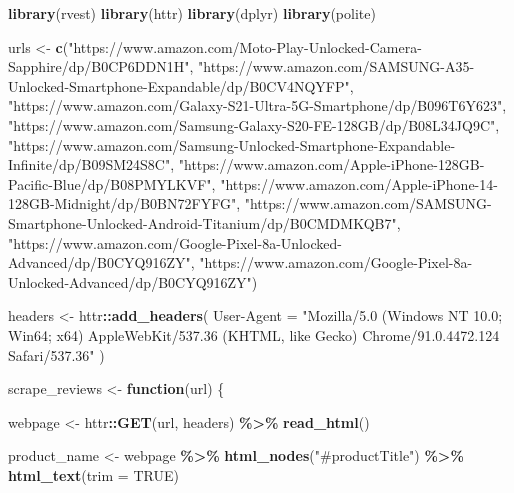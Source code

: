 \documentclass[
  11pt,
]{article}
\newenvironment{Shaded}{\begin{snugshade}}{\end{snugshade}}
\newcommand{\AttributeTok}[1]{\textcolor[rgb]{0.13,0.29,0.53}{#1}}
\newcommand{\ConstantTok}[1]{\textcolor[rgb]{0.56,0.35,0.01}{#1}}
\newcommand{\ControlFlowTok}[1]{\textcolor[rgb]{0.13,0.29,0.53}{\textbf{#1}}}
\newcommand{\FunctionTok}[1]{\textcolor[rgb]{0.13,0.29,0.53}{\textbf{#1}}}
\newcommand{\NormalTok}[1]{#1}
\newcommand{\OtherTok}[1]{\textcolor[rgb]{0.56,0.35,0.01}{#1}}
\newcommand{\SpecialCharTok}[1]{\textcolor[rgb]{0.81,0.36,0.00}{\textbf{#1}}}
\newcommand{\StringTok}[1]{\textcolor[rgb]{0.31,0.60,0.02}{#1}}
\begin{document}
\begin{Shaded}
\begin{Highlighting}[]
\FunctionTok{library}\NormalTok{(rvest)}
\FunctionTok{library}\NormalTok{(httr)}
\FunctionTok{library}\NormalTok{(dplyr)}
\FunctionTok{library}\NormalTok{(polite)}

\NormalTok{urls }\OtherTok{\textless{}{-}} \FunctionTok{c}\NormalTok{(}\StringTok{"https://www.amazon.com/Moto{-}Play{-}Unlocked{-}Camera{-}Sapphire/dp/B0CP6DDN1H"}\NormalTok{, }\StringTok{"https://www.amazon.com/SAMSUNG{-}A35{-}Unlocked{-}Smartphone{-}Expandable/dp/B0CV4NQYFP"}\NormalTok{, }\StringTok{"https://www.amazon.com/Galaxy{-}S21{-}Ultra{-}5G{-}Smartphone/dp/B096T6Y623"}\NormalTok{, }\StringTok{"https://www.amazon.com/Samsung{-}Galaxy{-}S20{-}FE{-}128GB/dp/B08L34JQ9C"}\NormalTok{, }\StringTok{"https://www.amazon.com/Samsung{-}Unlocked{-}Smartphone{-}Expandable{-}Infinite/dp/B09SM24S8C"}\NormalTok{, }\StringTok{"https://www.amazon.com/Apple{-}iPhone{-}128GB{-}Pacific{-}Blue/dp/B08PMYLKVF"}\NormalTok{, }\StringTok{"https://www.amazon.com/Apple{-}iPhone{-}14{-}128GB{-}Midnight/dp/B0BN72FYFG"}\NormalTok{, }\StringTok{"https://www.amazon.com/SAMSUNG{-}Smartphone{-}Unlocked{-}Android{-}Titanium/dp/B0CMDMKQB7"}\NormalTok{, }\StringTok{"https://www.amazon.com/Google{-}Pixel{-}8a{-}Unlocked{-}Advanced/dp/B0CYQ916ZY"}\NormalTok{, }\StringTok{"https://www.amazon.com/Google{-}Pixel{-}8a{-}Unlocked{-}Advanced/dp/B0CYQ916ZY"}\NormalTok{)}

\NormalTok{headers }\OtherTok{\textless{}{-}}\NormalTok{ httr}\SpecialCharTok{::}\FunctionTok{add\_headers}\NormalTok{(}
  \StringTok{\textasciigrave{}}\AttributeTok{User{-}Agent}\StringTok{\textasciigrave{}} \OtherTok{=} \StringTok{"Mozilla/5.0 (Windows NT 10.0; Win64; x64) AppleWebKit/537.36 (KHTML, like Gecko) Chrome/91.0.4472.124 Safari/537.36"}
\NormalTok{)}


\NormalTok{scrape\_reviews }\OtherTok{\textless{}{-}} \ControlFlowTok{function}\NormalTok{(url) \{}
  
\NormalTok{  webpage }\OtherTok{\textless{}{-}}\NormalTok{ httr}\SpecialCharTok{::}\FunctionTok{GET}\NormalTok{(url, headers) }\SpecialCharTok{\%\textgreater{}\%} \FunctionTok{read\_html}\NormalTok{()}

\NormalTok{  product\_name }\OtherTok{\textless{}{-}}\NormalTok{ webpage }\SpecialCharTok{\%\textgreater{}\%}
    \FunctionTok{html\_nodes}\NormalTok{(}\StringTok{"\#productTitle"}\NormalTok{) }\SpecialCharTok{\%\textgreater{}\%}
    \FunctionTok{html\_text}\NormalTok{(}\AttributeTok{trim =} \ConstantTok{TRUE}\NormalTok{)}
  

\end{Highlighting}
\end{Shaded}
\end{document}
